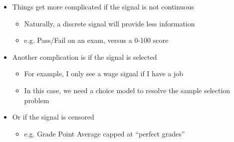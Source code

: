 \documentclass[aspectratio=169]{beamer}
\begin{document}
\begin{frame}

\begin{itemize}
\itemsep1.5em
\item<1-> Things get more complicated if the signal is not continuous
\bigskip\par
\begin{itemize}
\itemsep1.5em
\item<2-> Naturally, a discrete signal will provide less information

\item<3-> e.g. Pass/Fail on an exam, versus a 0-100 score
\end{itemize}

\item<4-> Another complication is if the signal is selected
\bigskip\par
\begin{itemize}
\itemsep1.5em
\item<5-> For example, I only see a wage signal if I have a job

\item<6-> In this case, we need a choice model to resolve the sample selection problem

\end{itemize}
\item<7-> Or if the signal is censored
\bigskip\par
\begin{itemize}
\itemsep1.5em
\item<8-> e.g. Grade Point Average capped at ``perfect grades''

\end{itemize}
\end{itemize}

\end{frame}
\end{document}
